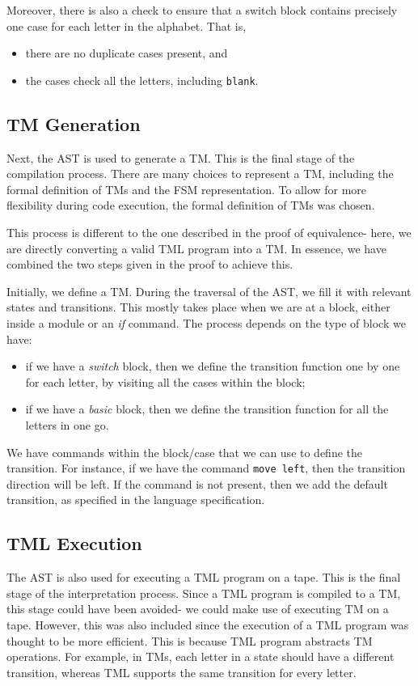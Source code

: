 Moreover, there is also a check to ensure that a switch block contains precisely one case for each letter in the alphabet. That is,
\begin{itemize}
    \item there are no duplicate cases present, and 
    \item the cases check all the letters, including \texttt{blank}.
\end{itemize}

\subsection{TM Generation}
Next, the AST is used to generate a TM. This is the final stage of the compilation process. There are many choices to represent a TM, including the formal definition of TMs and the FSM representation. To allow for more flexibility during code execution, the formal definition of TMs was chosen. 

This process is different to the one described in the proof of equivalence- here, we are directly converting a valid TML program into a TM. In essence, we have combined the two steps given in the proof to achieve this.

Initially, we define a TM. During the traversal of the AST, we fill it with relevant states and transitions. This mostly takes place when we are at a block, either inside a module or an \textit{if} command. The process depends on the type of block we have:
\begin{itemize}
    \item if we have a \textit{switch} block, then we define the transition function one by one for each letter, by visiting all the cases within the block;
    \item if we have a \textit{basic} block, then we define the transition function for all the letters in one go.
\end{itemize}
We have commands within the block/case that we can use to define the transition. For instance, if we have the command \texttt{move left}, then the transition direction will be left. If the command is not present, then we add the default transition, as specified in the language specification.

\subsection{TML Execution}

The AST is also used for executing a TML program on a tape. This is the final stage of the interpretation process. Since a TML program is compiled to a TM, this stage could have been avoided- we could make use of executing TM on a tape. However, this was also included since the execution of a TML program was thought to be more efficient. This is because TML program abstracts TM operations. For example, in TMs, each letter in a state should have a different transition, whereas TML supports the same transition for every letter.

